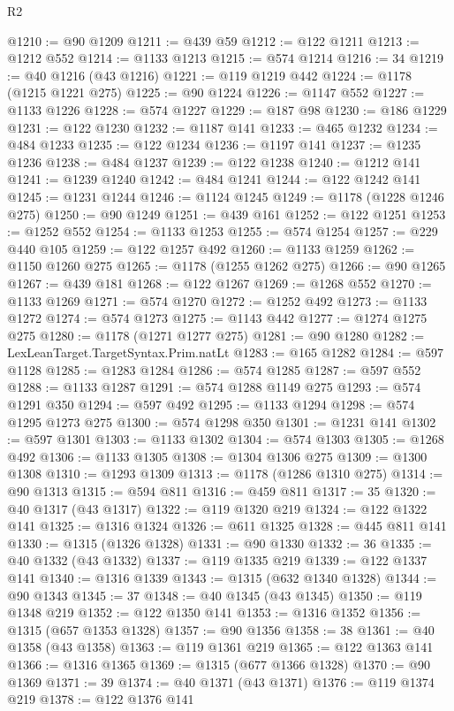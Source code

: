 \begin{lexlean}{R2}
\begin{coremodule}
{{{{{{{{{{{{{{{{{{{{{{{{{{{{{{{{{{{{{{{{{{{{{{{{{{{{{{{{{{{{{{{{{{{{{{{{{{{{{{{{{{{{{{{{{{{{@1210 := @90 @1209
@1211 := @439 @59
@1212 := @122 @1211
@1213 := @1212 @552
@1214 := @1133 @1213
@1215 := @574 @1214
@1216 := 34
@1219 := @40 @1216 (@43 @1216)
@1221 := @119 @1219 @442
@1224 := @1178 (@1215 @1221 @275)
@1225 := @90 @1224
@1226 := @1147 @552
@1227 := @1133 @1226
@1228 := @574 @1227
@1229 := @187 @98
@1230 := @186 @1229
@1231 := @122 @1230
@1232 := @1187 @141
@1233 := @465 @1232
@1234 := @484 @1233
@1235 := @122 @1234
@1236 := @1197 @141
@1237 := @1235 @1236
@1238 := @484 @1237
@1239 := @122 @1238
@1240 := @1212 @141
@1241 := @1239 @1240
@1242 := @484 @1241
@1244 := @122 @1242 @141
@1245 := @1231 @1244
@1246 := @1124 @1245
@1249 := @1178 (@1228 @1246 @275)
@1250 := @90 @1249
@1251 := @439 @161
@1252 := @122 @1251
@1253 := @1252 @552
@1254 := @1133 @1253
@1255 := @574 @1254
@1257 := @229 @440 @105
@1259 := @122 @1257 @492
@1260 := @1133 @1259
@1262 := @1150 @1260 @275
@1265 := @1178 (@1255 @1262 @275)
@1266 := @90 @1265
@1267 := @439 @181
@1268 := @122 @1267
@1269 := @1268 @552
@1270 := @1133 @1269
@1271 := @574 @1270
@1272 := @1252 @492
@1273 := @1133 @1272
@1274 := @574 @1273
@1275 := @1143 @442
@1277 := @1274 @1275 @275
@1280 := @1178 (@1271 @1277 @275)
@1281 := @90 @1280
@1282 := LexLeanTarget.TargetSyntax.Prim.natLt
@1283 := @165 @1282
@1284 := @597 @1128
@1285 := @1283 @1284
@1286 := @574 @1285
@1287 := @597 @552
@1288 := @1133 @1287
@1291 := @574 @1288 @1149 @275
@1293 := @574 @1291 @350
@1294 := @597 @492
@1295 := @1133 @1294
@1298 := @574 @1295 @1273 @275
@1300 := @574 @1298 @350
@1301 := @1231 @141
@1302 := @597 @1301
@1303 := @1133 @1302
@1304 := @574 @1303
@1305 := @1268 @492
@1306 := @1133 @1305
@1308 := @1304 @1306 @275
@1309 := @1300 @1308
@1310 := @1293 @1309
@1313 := @1178 (@1286 @1310 @275)
@1314 := @90 @1313
@1315 := @594 @811
@1316 := @459 @811
@1317 := 35
@1320 := @40 @1317 (@43 @1317)
@1322 := @119 @1320 @219
@1324 := @122 @1322 @141
@1325 := @1316 @1324
@1326 := @611 @1325
@1328 := @445 @811 @141
@1330 := @1315 (@1326 @1328)
@1331 := @90 @1330
@1332 := 36
@1335 := @40 @1332 (@43 @1332)
@1337 := @119 @1335 @219
@1339 := @122 @1337 @141
@1340 := @1316 @1339
@1343 := @1315 (@632 @1340 @1328)
@1344 := @90 @1343
@1345 := 37
@1348 := @40 @1345 (@43 @1345)
@1350 := @119 @1348 @219
@1352 := @122 @1350 @141
@1353 := @1316 @1352
@1356 := @1315 (@657 @1353 @1328)
@1357 := @90 @1356
@1358 := 38
@1361 := @40 @1358 (@43 @1358)
@1363 := @119 @1361 @219
@1365 := @122 @1363 @141
@1366 := @1316 @1365
@1369 := @1315 (@677 @1366 @1328)
@1370 := @90 @1369
@1371 := 39
@1374 := @40 @1371 (@43 @1371)
@1376 := @119 @1374 @219
@1378 := @122 @1376 @141
}}}}}}}}}}}}}}}}}}}}}}}}}}}}}}}}}}}}}}}}}}}}}}}}}}}}}}}}}}}}}}}}}}}}}}}}}}}}}}}}}}}}}}}}}}}}
\end{coremodule}
\end{lexlean}
